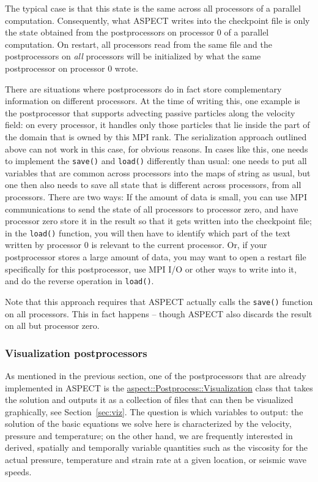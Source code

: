 \documentclass{article}
\newcommand{\aspect}{\textsc{ASPECT}}
\begin{document}
The typical case is that this state is the same across all processors of a
parallel computation. Consequently, what \aspect{} writes into the checkpoint
file is only the state obtained from the postprocessors on processor 0 of a
parallel computation. On restart, all processors read from the same file and
the postprocessors on \textit{all} processors will be initialized by what the
same postprocessor on processor 0 wrote.

There are situations where postprocessors do in fact store complementary
information on different processors. At the time of writing this, one example
is the postprocessor that supports advecting passive particles along the
velocity field: on every processor, it handles only those particles that lie
inside the part of the domain that is owned by this MPI rank. The
serialization approach outlined above can not work in this case, for obvious
reasons. In cases like this, one needs to implement the \texttt{save()} and
\texttt{load()} differently than usual: one needs to put all variables that
are common across processors into the maps of string as usual, but one then
also needs to save all state that is different across processors, from all
processors. There are two ways: If the amount of data is small, you can use
MPI communications to send the state of all processors to processor zero, and
have processor zero store it in the result so that it gets written into the
checkpoint file; in the \texttt{load()} function, you will then have to
identify which part of the text written by processor 0 is relevant to the
current processor. Or, if your postprocessor stores a large amount of data, you
may want to open a restart file specifically for this postprocessor, use MPI
I/O or other ways to write into it, and do the reverse operation in
\texttt{load()}.

Note that this approach requires that \aspect{} actually calls the
\texttt{save()} function on all processors. This in fact happens -- though
\aspect{} also discards the result on all but processor zero.


\subsubsection{Visualization postprocessors}
\label{sec:viz-postpostprocessors}

As mentioned in the previous section, one of the postprocessors that are
already implemented in \aspect{} is the \href{doc/doxygen/classaspect_1_1Postprocess_1_1Visualization.html}{aspect::Postprocess::Visualization}
class that takes the solution and outputs it as a collection of files that can
then be visualized graphically, see Section~\ref{sec:viz}. The question is
which variables to output: the solution of the basic equations we solve here
is characterized by the velocity, pressure and temperature; on the other hand,
we are frequently interested in derived, spatially and temporally variable
quantities such as the viscosity for the actual pressure, temperature and
strain rate at a given location, or seismic wave speeds.
\end{document}
